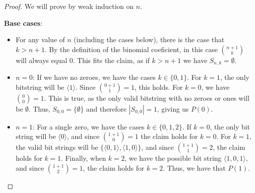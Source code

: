 \documentclass[titlepage]{article}
\begin{document}
\begin{proof}
We will prove by weak induction on $n$.

\textbf{Base cases}: 
\begin{itemize}
\item For any value of $n$ (including the cases below), there is the case that $k > n+1$. By the definition of the binomial coeficient, in this case ${n+1}\choose{k}$ will always equal $0$. This fits the claim, as if $k > n+1$ we have $S_{n,k} = \emptyset$.
\item \emph{$n = 0$}: If we have no zeroes, we have the cases $k \in \{0,1\}$. For $k=1$, the only bitstring will be $\langle 1 \rangle$. Since ${{0+1}\choose{1}}=1$, this holds. For $k=0$, we have ${{0}\choose{0}}=1$. This is true, as the only valid bitstring with no zeroes or ones will be $\emptyset$. Thus, $S_{0,0} = \{\emptyset\}$ and therefore $|S_{0,0}|=1$, giving us $P(0)$.
\item \emph{$n = 1$}: For a single zero, we have the cases $k \in \{0,1,2\}$. If $k=0$, the only bit string will be $\langle 0 \rangle$, and since ${{1+1}\choose{0}}=1$ the claim holds for $k=0$. For $k=1$, the valid bit strings will be $\{\langle 0,1 \rangle , \langle 1,0 \rangle\}$, and since ${{1+1}\choose{1}}=2$, the claim holds for $k=1$. Finally, when $k=2$, we have the possible bit string $\langle 1,0,1 \rangle$, and since ${{1+1}\choose{2}}=1$, the claim holds for $k=2$. Thus, we have that $P(1)$. 
\end{itemize}



\end{proof}
\end{document}
